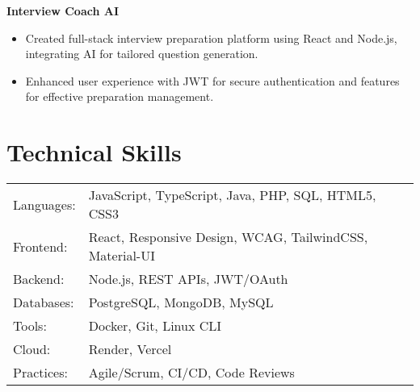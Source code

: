 \documentclass[a4paper,10pt]{article}
\begin{document}
\textbf{Interview Coach AI}
\begin{itemize}[leftmargin=0.15in, label={}]
    \item Created full-stack interview preparation platform using React and Node.js, integrating AI for tailored question generation.
    \item Enhanced user experience with JWT for secure authentication and features for effective preparation management.
\end{itemize}

\section{Technical Skills}
\begin{tabular}{ l l }
Languages: & JavaScript, TypeScript, Java, PHP, SQL, HTML5, CSS3 \\
Frontend: & React, Responsive Design, WCAG, TailwindCSS, Material-UI \\
Backend: & Node.js, REST APIs, JWT/OAuth \\
Databases: & PostgreSQL, MongoDB, MySQL \\
Tools: & Docker, Git, Linux CLI \\
Cloud: & Render, Vercel \\
Practices: & Agile/Scrum, CI/CD, Code Reviews \\
\end{tabular}
\end{document}
